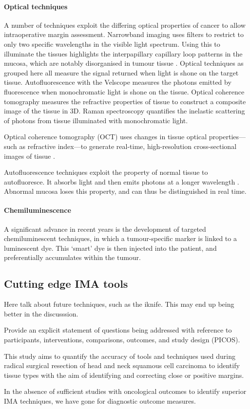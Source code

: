 \paragraph{Optical techniques}
A number of techniques exploit the differing optical properties of cancer to allow intraoperative margin assessment.
Narrowband imaging uses filters to restrict to only two specific wavelengths in the visible light spectrum.
Using this to illuminate the tissues highlights the interpapillary capillary loop patterns in the mucosa, which are notably disorganised in tumour tissue \cite{vuEfficacyNarrowBand2014}.
Optical techniques as grouped here all measure the signal returned when light is shone on the target tissue.
Autofluorescence with the Velscope measures the photons emitted by fluorescence when monochromatic light is shone on the tissue.
Optical coherence tomography measures the refractive properties of tissue to construct a composite image of the tissue in 3D.
Raman spectroscopy quantifies the inelastic scattering of photons from tissue illuminated with monochromatic light.

Optical coherence tomography (OCT) uses changes in tissue optical properties---such as refractive index---to generate real-time, high-resolution cross-sectional images of tissue \cite{heidaria.e.UseOpticalCoherence2020}.

Autofluorescence techniques exploit the property of normal tissue to autofluoresce. 
It absorbs light and then emits photons at a longer wavelength \cite{leey.-j.IntraoperativeFluorescenceGuidedSurgery2020}.
Abnormal mucosa loses this property, and can thus be distinguished in real time.

\paragraph{Chemiluminescence}

A significant advance in recent years is the development of targeted chemiluminescent techniques, in which a tumour-specific marker is linked to a luminescent dye. 
This `smart' dye is then injected into the patient, and preferentially accumulates within the tumour. 

\subsection{Cutting edge IMA tools}

Here talk about future techniques, such as the iknife. 
This may end up being better in the discusssion.

Provide an explicit statement of questions being addressed with reference to participants, interventions, comparisons, outcomes, and study design (PICOS). 

This study aims to quantify the accuracy of tools and techniques used during radical surgical resection of head and neck squamous cell carcinoma to identify tissue types with the aim of identifying and correcting close or positive margins.


In the absence of sufficient studies with oncological outcomes to identify superior IMA techniques, we have gone for diagnostic outcome measures.
